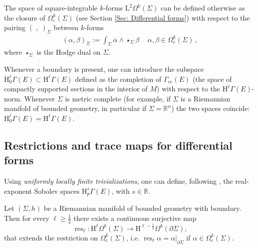 \begin{remark}\label{Rmk: L2 space of forms}
	The space of square-integrable $k$-forms $\mathrm{L}^2\Omega^k(\Sigma)$ can be defined otherwise as the closure of $\Omega^k_{\mathrm{c}}(\Sigma)$ (see Section \ref{Sec: Differential forms}) with respect to the pairing $(\;,\;)_\Sigma$ between $k$-forms
	\begin{align}%
	(\alpha,\beta)_\Sigma:=\int_\Sigma\overline{\alpha}\wedge\star_\Sigma\beta\,\quad \alpha,\beta\in\Omega^k_{\mathrm{c}}(\Sigma)\,,
	\end{align}
	where $\star_\Sigma$ is the Hodge dual on $\Sigma$.
\end{remark}



Whenever a boundary is present, one can introduce the subspace $\mathrm{H}_0^\ell\Gamma(E)\subset\mathrm{H}^\ell\Gamma(E)$ defined as the completion of $\Gamma_\mathrm{cc}(E)$ (the space of compactly supported sections in the interior of $M$) with respect to the $\mathrm{H}^\ell\Gamma(E)$-norm. Whenever $\Sigma$ is metric complete (for example, if $\Sigma$ is a Riemannian manifold of bounded geometry, in particular if $\Sigma=\mathbb{R}^n$) the two spaces coincide: $\mathrm{H}_0^\ell\Gamma(E)=\mathrm{H}^\ell\Gamma(E)$.

\subsection{Restrictions and trace maps for differential forms}
\label{Sub: Restriction}

Using \emph{uniformly locally finite trivializations}, one can define, following \cite[Def. 11]{Grosse-Schneider-13}, the real-exponent Sobolev spaces $\mathrm{H}_p^{s}\Gamma(E)$, with $s\in\mathbb{R}$.

\begin{proposition}\label{Prop: Sobolev restriction map}
	Let $(\Sigma,h)$ be a Riemannian manifold of bounded geometry with boundary. Then for every $\ell\geq\frac12$ there exists a continuous surjective map
	\begin{equation}
	\operatorname{res}_\ell:\mathrm{H}^\ell\Omega^k(\Sigma)\to\mathrm{H}^{\ell-\frac12}\Omega^k(\partial\Sigma),
	\end{equation}
	that extends the restriction on $\Omega_\mathrm{c}^k(\Sigma)$, i.e. $\operatorname{res}_\ell\alpha=\alpha|_{\partial\Sigma}$ if $\alpha\in \Omega_\mathrm{c}^k(\Sigma)$.
\end{proposition}

